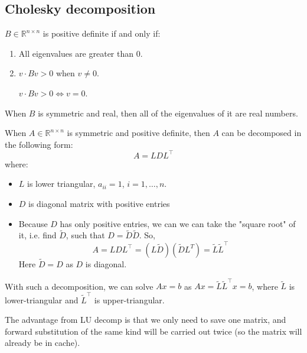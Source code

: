\subsection{Cholesky decomposition}

\begin{definition}
    $B \in \mathbb{R}^{n \times n}$ is positive definite if and only if:
    \begin{enumerate}
        \item {
            All eigenvalues are greater than 0.
        }
        \item {
            $v \cdot Bv > 0$ when $v \ne 0$.

            $v \cdot Bv > 0 \Longleftrightarrow v = 0$.
        }
    \end{enumerate}
\end{definition}

\begin{statement}
    When $B$ is symmetric and real, then all of the eigenvalues of it are real numbers.
\end{statement}

\begin{definition}
    When $A \in \mathbb{R}^{n \times n}$ is symmetric and positive definite,
    then $A$ can be decomposed in the following form:
    \[ A = LDL^\intercal \]
    where:
    \begin{itemize}
        \item {
            $L$ is lower triangular, $a_{ii} = 1$, $i = 1, \dots, n$.
        }
        \item {
            $D$ is diagonal matrix with positive entries
        }
        \item {
            Because $D$ has only positive entries, we can we can 
            take the "square root" of it, i.e. find $\tilde{D}$, such that
            $D = \tilde{D} \tilde{D}$.
            So,
            \[ A = L D L^\intercal = (L\tilde{D}) (\tilde{D} L^T) = \tilde{L} \tilde{L}^\intercal \]
            Here $\tilde{D} = D$ as $D$ is diagonal.
        }
    \end{itemize}
\end{definition}

With such a decomposition, we can solve $Ax = b$ as
$Ax = \tilde{L} \tilde{L}^\intercal x = b$, where
$\tilde{L}$ is lower-triangular and $\tilde{L}^\intercal$ is upper-triangular.

The advantage from LU decomp is that we only need to save one matrix,
and forward substitution of the same kind will be carried out twice (so the matrix
will already be in cache).

